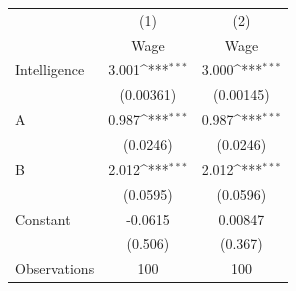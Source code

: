 {
\def\sym#1{\ifmmode^{#1}\else\(^{#1}\)\fi}
\begin{tabular}{l*{2}{c}}
\toprule
                    &\multicolumn{1}{c}{(1)}&\multicolumn{1}{c}{(2)}\\
                    &\multicolumn{1}{c}{Wage}&\multicolumn{1}{c}{Wage}\\
\midrule
Intelligence        &       3.001\sym{***}&       3.000\sym{***}\\
                    &   (0.00361)         &   (0.00145)         \\
\addlinespace
A                   &       0.987\sym{***}&       0.987\sym{***}\\
                    &    (0.0246)         &    (0.0246)         \\
\addlinespace
B                   &       2.012\sym{***}&       2.012\sym{***}\\
                    &    (0.0595)         &    (0.0596)         \\
\addlinespace
Constant            &     -0.0615         &     0.00847         \\
                    &     (0.506)         &     (0.367)         \\
\midrule
Observations        &         100         &         100         \\
\bottomrule
\end{tabular}
}
